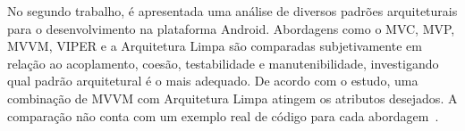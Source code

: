 No segundo trabalho, é apresentada uma análise de diversos padrões arquiteturais para o desenvolvimento na plataforma Android.
Abordagens como o MVC, MVP, MVVM, VIPER e a Arquitetura Limpa são comparadas subjetivamente em relação ao acoplamento, coesão, testabilidade e manutenibilidade, investigando qual padrão arquitetural é o mais adequado.
De acordo com o estudo, uma combinação de MVVM com Arquitetura Limpa atingem os atributos desejados.
A comparação não conta com um exemplo real de código para cada abordagem~\cite{akhtar}.